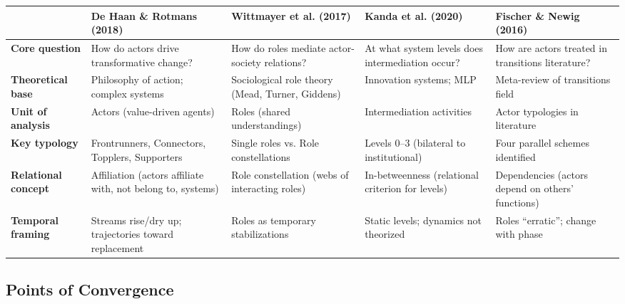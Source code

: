 \documentclass[../main.tex]{subfiles}
\begin{document}
\tableminimal
\begin{center}
\begin{tabular}{@{}p{2.2cm}p{2.8cm}p{2.8cm}p{2.8cm}p{2.8cm}@{}}
\toprule
& \textbf{De Haan \& Rotmans (2018)} & \textbf{Wittmayer et al. (2017)} & \textbf{Kanda et al. (2020)} & \textbf{Fischer \& Newig (2016)} \\
\midrule

\textbf{Core question} &
How do actors drive transformative change? &
How do roles mediate actor-society relations? &
At what system levels does intermediation occur? &
How are actors treated in transitions literature? \\

\textbf{Theoretical base} &
Philosophy of action; complex systems &
Sociological role theory (Mead, Turner, Giddens) &
Innovation systems; MLP &
Meta-review of transitions field \\

\textbf{Unit of analysis} &
Actors (value-driven agents) &
Roles (shared understandings) &
Intermediation activities &
Actor typologies in literature \\

\textbf{Key typology} &
Frontrunners, Connectors, Topplers, Supporters &
Single roles vs. Role constellations &
Levels 0--3 (bilateral to institutional) &
Four parallel schemes identified \\

\textbf{Relational concept} &
Affiliation (actors affiliate with, not belong to, systems) &
Role constellation (webs of interacting roles) &
In-betweenness (relational criterion for levels) &
Dependencies (actors depend on others' functions) \\

\textbf{Temporal framing} &
Streams rise/dry up; trajectories toward replacement &
Roles as temporary stabilizations &
Static levels; dynamics not theorized &
Roles ``erratic''; change with phase \\

\bottomrule
\end{tabular}
\label{tab:background:framework-comparison}
\end{center}

\subsection{Points of Convergence}
\end{document}
